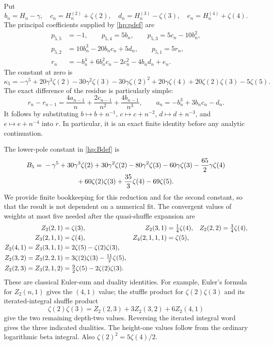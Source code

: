 \documentclass[11pt]{article}
\numberwithin{equation}{section}
\theoremstyle{plain}
\theoremstyle{definition}
\theoremstyle{remark}
\begin{document}
Put
\[
 b_n=H_n-\gamma,\quad c_n=H_n^{(2)}+\zeta(2),\quad
 d_n=H_n^{(3)}-\zeta(3),\quad e_n=H_n^{(4)}+\zeta(4).
\]
The principal coefficients supplied by \eqref{hp:pdef} are
\begin{equation}\label{hp:fifthparts}
 \begin{aligned}
 p_{5,5}&=-1,\qquad p_{5,4}=5b_n,\qquad p_{5,3}=5c_n-10b_n^2,\\
 p_{5,2}&=10b_n^3-20b_nc_n+5d_n,\qquad p_{5,1}=5r_n,\\
 r_n&=-b_n^4+6b_n^2c_n-2c_n^2-4b_nd_n+e_n.
 \end{aligned}
\end{equation}
The constant at zero is
\begin{equation}\label{hp:kappa5}
 \kappa_5=-\gamma^5+20\gamma^3\zeta(2)-30\gamma^2\zeta(3)
 -30\gamma\zeta(2)^2+20\gamma\zeta(4)
 +20\zeta(2)\zeta(3)-5\zeta(5).
\end{equation}
The exact difference of the residue is particularly simple:
\begin{equation}\label{hp:resdiff}
 r_n-r_{n-1}=\frac{4a_{n-1}}n+\frac{2c_{n-1}}{n^2}
                         +\frac{4b_{n-1}}{n^3},
 \qquad a_n=-b_n^3+3b_nc_n-d_n.
\end{equation}
It follows by substituting $b\mapsto b+n^{-1}$,
$c\mapsto c+n^{-2}$, $d\mapsto d+n^{-3}$, and
$e\mapsto e+n^{-4}$ into $r$. In particular, it is an exact finite
identity before any analytic continuation.

The lower-pole constant in \eqref{hp:Bdef} is
\begin{align}\label{hp:B5}
 B_5={}&-\gamma^5+30\gamma^3\zeta(2)+30\gamma^2\zeta(2)
      -80\gamma^2\zeta(3)-60\gamma\zeta(3)
      -\frac{65}{2}\gamma\zeta(4)\notag\\
 &\hspace{17mm}+60\zeta(2)\zeta(3)+\frac{35}{3}\zeta(4)-69\zeta(5).
\end{align}
We provide finite bookkeeping for this reduction and for the second
constant, so that the result is not dependent on a numerical fit.
The convergent values of weights at most five needed after the
quasi-shuffle expansion are
\begin{align}\label{hp:MZVtable}
 Z_2(2,1)&=\zeta(3),&Z_2(3,1)&=\tfrac14\zeta(4),&
 Z_2(2,2)&=\tfrac34\zeta(4),\notag\\
 Z_3(2,1,1)&=\zeta(4),&Z_4(2,1,1,1)&=\zeta(5),\notag\\
 Z_2(4,1)=Z_3(3,1,1)&=2\zeta(5)-\zeta(2)\zeta(3),\notag\\
 Z_2(3,2)=Z_3(2,2,1)&=3\zeta(2)\zeta(3)-\tfrac{11}{2}\zeta(5),\notag\\
 Z_2(2,3)=Z_3(2,1,2)&=\tfrac92\zeta(5)-2\zeta(2)\zeta(3).
\end{align}
These are classical Euler-sum and duality identities. For example,
Euler's formula for $Z_2(n,1)$ gives the $(4,1)$ value; the stuffle
product for $\zeta(2)\zeta(3)$ and its iterated-integral shuffle
product
\[
 \zeta(2)\zeta(3)=Z_2(2,3)+3Z_2(3,2)+6Z_2(4,1)
\]
give the two remaining depth-two values. Reversing the iterated
integral word gives the three indicated dualities. The height-one
values follow from the ordinary logarithmic beta integral. Also
$\zeta(2)^2=5\zeta(4)/2$.
\end{document}
